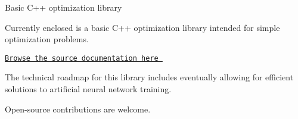 Basic C++ optimization library

Currently enclosed is a basic C++ optimization library intended for simple optimization problems.

\href{https://charelstoncrabb.github.io/basic_opt/html/index.html}{\tt Browse the source documentation here }

The technical roadmap for this library includes eventually allowing for efficient solutions to artificial neural network training.

Open-\/source contributions are welcome. 